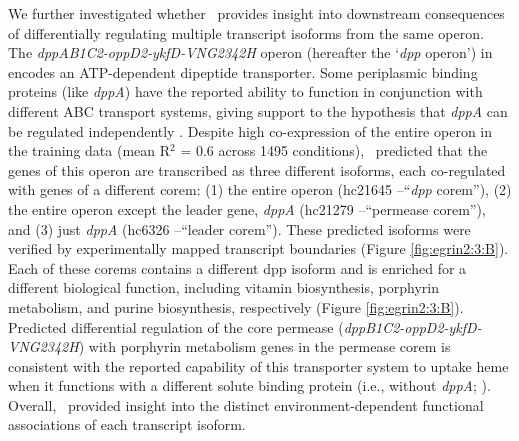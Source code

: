 We further investigated whether \egrine~provides insight into downstream consequences of differentially regulating multiple transcript isoforms from the same operon. The \textit{dppAB1C2-oppD2-ykfD-VNG2342H} operon (hereafter the ‘\textit{dpp} operon’) in \halo encodes an ATP-dependent dipeptide transporter. Some periplasmic binding proteins (like \textit{dppA}) have the reported ability to function in conjunction with different ABC transport systems, giving support to the hypothesis that \textit{dppA} can be regulated independently \cite{higgins_binding_1990}. Despite high co-expression of the entire operon in the training data (mean R$^{2}$ = 0.6 across 1495 conditions), \egrine~predicted that the genes of this operon are transcribed as three different isoforms, each co-regulated with genes of a different corem: (1) the entire operon (hc21645 –“\textit{dpp} corem”), (2) the entire operon except the leader gene, \textit{dppA} (hc21279 –“permease corem”), and (3) just \textit{dppA} (hc6326 –“leader corem”). These predicted isoforms were verified by experimentally mapped transcript boundaries (Figure \ref{fig:egrin2:3:B}). Each of these corems contains a different dpp isoform and is enriched for a different biological function, including vitamin biosynthesis, porphyrin metabolism, and purine biosynthesis, respectively (Figure \ref{fig:egrin2:3:B}). Predicted differential regulation of the core permease (\textit{dppB1C2-oppD2-ykfD-VNG2342H}) with porphyrin metabolism genes in the permease corem is consistent with the reported capability of this transporter system to uptake heme when it functions with a different solute binding protein (i.e., without \textit{dppA}; \cite{letoffe_housekeeping_2006}). Overall, \egrine~provided insight into the distinct environment-dependent functional associations of each transcript isoform.   

